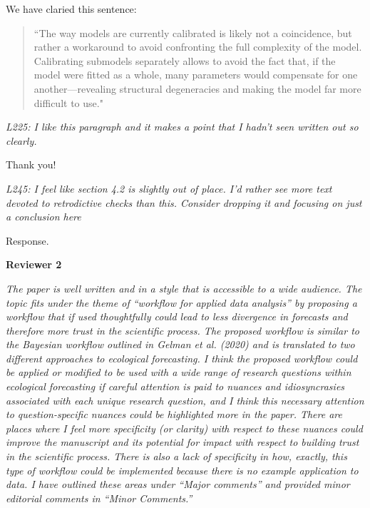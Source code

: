 \documentclass[11pt,letter]{article}
\begin{document}
We have claried this sentence:
\begin{quote}
``The way models are currently calibrated is likely not a coincidence, but rather a workaround to avoid confronting the full complexity of the model. Calibrating submodels separately allows to avoid the fact that, if the model were fitted as a whole, many parameters would compensate for one another---revealing structural degeneracies and making the model far more difficult to use."
\end{quote}

\begin{mybox}
\emph{L225: I like this paragraph and it makes a point that I hadn’t seen written out so clearly.}
\end{mybox}

Thank you!

\begin{mybox}
\emph{L245: I feel like section 4.2 is slightly out of place. I’d rather see more text devoted to retrodictive checks than this. Consider dropping it and focusing on just a conclusion here}
\end{mybox}

Response. %

{\bf Reviewer 2}

\begin{mybox}
\emph{The paper is well written and in a style that is accessible to a wide audience. The topic fits under the theme of “workflow for applied data analysis” by proposing a workflow that if used thoughtfully could lead to less divergence in forecasts and therefore more trust in the scientific process. The proposed workflow is similar to the Bayesian workflow outlined in Gelman et al. (2020) and is translated to two different approaches to ecological forecasting. I think the proposed workflow could be applied or modified to be used with a wide range of research questions within ecological forecasting if careful attention is paid to nuances and idiosyncrasies associated with each unique research question, and I think this necessary attention to question-specific nuances could be highlighted more in the paper. There are places where I feel more specificity (or clarity) with respect to these nuances could improve the manuscript and its potential for impact with respect to building trust in the scientific process. There is also a lack of specificity in how, exactly, this type of workflow could be implemented because there
is no example application to data. I have outlined these areas under “Major comments” and provided minor editorial comments in “Minor Comments.”}
\end{mybox}
\end{document}
